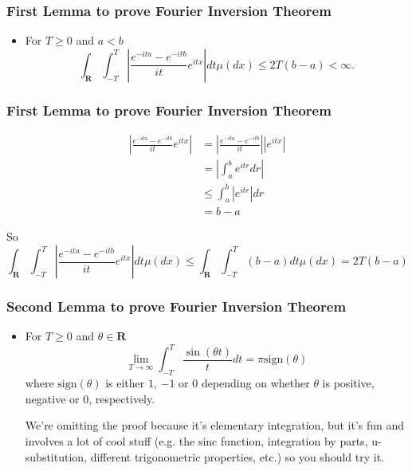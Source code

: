 \documentclass[handout]{beamer}
\begin{document}
\frame
{
  \frametitle{First Lemma to prove Fourier Inversion Theorem} 

 \begin{itemize}
 
  \item<1->[] \begin{Theorem}[Lemma 11.1.2] 
  For $T \ge 0$ and $a < b$
  	$$\int_{\mathbf{R}} \int_{-T}^T \left| \frac{ e^{-ita} - e^{-itb} }{it} e^{itx} \right| dt \mu(dx) \le 2T(b-a) < \infty.$$
   \end{Theorem}
  
 
\end{itemize}
}


\frame
{
  \frametitle{First Lemma to prove Fourier Inversion Theorem} 

\begin{align*}
\left| \frac{ e^{-ita} - e^{-itb} }{it} e^{itx} \right| &= \left| \frac{ e^{-ita} - e^{-itb} }{it}  \right||e^{itx}| \\
&= \left| \int_a^b e^{itr} dr  \right| \\
&\le  \int_a^b |e^{itr}| dr  \\
&= b-a 
\end{align*}

So
$$
\int_{\mathbf{R}} \int_{-T}^T \left| \frac{ e^{-ita} - e^{-itb} }{it} e^{itx} \right| dt \mu(dx) \le \int_{\mathbf{R}} \int_{-T}^T (b-a) dt \mu(dx) = 2T(b-a)
$$

}


\frame
{
  \frametitle{Second Lemma to prove Fourier Inversion Theorem} 

 \begin{itemize}
 
  \item<1->[] \begin{Theorem}[Lemma 11.1.3] 
	For $T \ge 0$ and $\theta \in \mathbf{R}$
	$$
	\lim_{T \to \infty}\int_{-T}^T \frac{\sin(\theta t)}{t}dt = \pi \text{sign}(\theta)
	$$
	where $\text{sign}(\theta)$ is either $1$, $-1$ or $0$ depending on whether $\theta$ is positive, negative or $0$, respectively.
   \end{Theorem}
  
 We're omitting the proof because it's elementary integration, but it's fun and involves a lot of cool stuff (e.g. the sinc function, integration by parts, u-substitution, different trigonometric properties, etc.) so you should try it.
\end{itemize}
}
\end{document}
